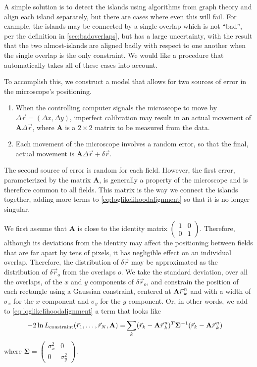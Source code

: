 \documentclass{article}
\newcommand{\svec}[1]{{\vec{#1}\mkern2mu\vphantom{#1}}}
\newcommand{\matrixbold}[1]{\mathbf{#1}}
\begin{document}
A simple solution is to detect the islands using algorithms from graph theory and align each island separately, but there are cases where even this will fail.  For example, the islands may be connected by a single overlap which is not ``bad'', per the definition in \cref{sec:badoverlaps}, but has a large uncertainty, with the result that the two almost-islands are aligned badly with respect to one another when the single overlap is the only constraint.  We would like a procedure that automatically takes all of these cases into account.

To accomplish this, we construct a model that allows for two sources of error in the microscope's positioning.
\begin{enumerate}
	\item When the controlling computer signals the microscope to move by $\Delta \vec{r}=(\Delta x, \Delta y)$, imperfect calibration may result in an actual movement of $\matrixbold{A}\Delta\vec{r}$, where $\matrixbold{A}$ is a $2\times2$ matrix to be measured from the data.
	\item Each movement of the microscope involves a random error, so that the final, actual movement is $\matrixbold{A}\Delta\vec{r}+\delta\vec{r}$.
\end{enumerate}
The second source of error is random for each field.  However, the first error, parameterized by the matrix $\matrixbold{A}$, is generally a property of the microscope and is therefore common to all fields.  This matrix is the way we connect the islands together, adding more terms to \cref{eq:loglikelihoodalignment} so that it is no longer singular.

We first assume that $\matrixbold{A}$ is close to the identity matrix $\begin{pmatrix}1 & 0 \\ 0 & 1\end{pmatrix}$.  Therefore, although its deviations from the identity may affect the positioning between fields that are far apart by tens of pixels, it has negligible effect on an individual overlap.  Therefore, the distribution of $\delta\vec{r}$ may be approximated as the distribution of $\delta\vec{r}_o$ from the overlaps $o$.  We take the standard deviation, over all the overlaps, of the $x$ and $y$ components of $\delta\vec{r}_o$, and constrain the position of each rectangle using a Gaussian constraint, centered at $\matrixbold{A}\svec{r}_k^n$ and with a width of $\sigma_x$ for the $x$ component and $\sigma_y$ for the $y$ component.  Or, in other words, we add to \cref{eq:loglikelihoodalignment} a term that looks like
\begin{align}
-2\ln L_\text{constraint}(\vec{r}_1, \ldots, \vec{r}_N, \matrixbold{A})=&
\sum_{k}(\vec{r}_{k} - \matrixbold{A}\svec{r}_{k}^n)^T %
\matrixbold{\Sigma}^{-1}
(\vec{r}_{k} - \matrixbold{A}\svec{r}_{k}^n)
\label{eq:loglikelihoodrandomerror}
\end{align}
where $\matrixbold{\Sigma}=\begin{pmatrix}\sigma_x^2 & 0 \\ 0 & \sigma_y^2\end{pmatrix}$.
\end{document}
